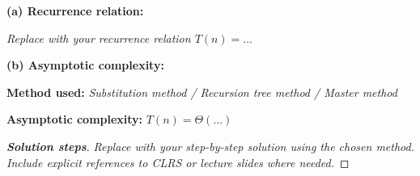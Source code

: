 \documentclass[dvipsnames]{article}
\begin{document}
\begin{problem}
\color{purple}

\textbf{(a) Recurrence relation:}

\begin{mdframed}
  \color{purple}
  \emph{Replace with your recurrence relation $T(n) = \ldots$}
\end{mdframed}

\textbf{(b) Asymptotic complexity:}

\begin{mdframed}
  \color{purple}
  \textbf{Method used:} \emph{Substitution method / Recursion tree method / Master method}
  
  \textbf{Asymptotic complexity:} $T(n) = \Theta(\ldots)$
  
  \begin{proof}[\textbf{Solution steps}]
    \emph{Replace with your step-by-step solution using the chosen method.}
    \emph{Include explicit references to CLRS or lecture slides where needed.}
  \end{proof}
\end{mdframed}

\end{problem}
\end{document}
